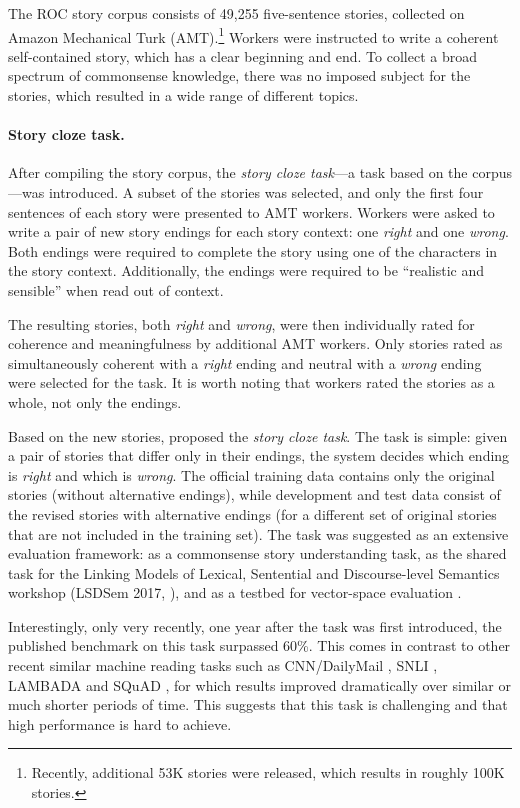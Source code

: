 \documentclass[11pt,a4paper]{article}
\newcommand{\nascomment}[1]{{\color{blue}\textsc{[#1 --nas]}}}
\begin{document}
The ROC story corpus consists of 49,255 five-sentence 
stories, collected on Amazon Mechanical Turk (AMT).\footnote{Recently,
  additional 53K stories were released, which results in roughly
  100K stories.}
Workers were instructed to write a coherent self-contained story, which has a clear beginning and end. 
To collect a broad spectrum of commonsense knowledge, there was no imposed subject for the stories,
which resulted in a wide range of different topics.

\paragraph{Story cloze task.}
After compiling the story corpus, the {\it story cloze task}---a task based on the corpus---was introduced.
A subset of the stories was selected, and only the first four sentences of each story were presented to AMT workers.
Workers were asked to write a pair of new story endings for each story context: one {\it right} and one {\it wrong}.
Both endings were required to complete the story using one of the characters in the story context. 
Additionally,  the endings were required to be ``realistic and sensible'' \cite{Mostafazadeh:2016} when read out of context.

The resulting stories, both {\it right} and {\it wrong}, were then individually rated for coherence and meaningfulness by additional AMT workers.
Only stories rated as simultaneously coherent with a {\it right} ending and neutral with a {\it wrong} ending were selected for the task. 
It is worth noting that workers rated the stories as a whole, not only the endings.

Based on the new stories, \citet{Mostafazadeh:2016} proposed the {\it story cloze task}. 
The task is simple:  given a pair of stories that differ only in their endings, the system decides which ending is {\it right} and which is {\it wrong}. 
The official training data contains only the original stories (without alternative endings), while development and test data consist of the revised stories with alternative endings (for a different set of original stories that are not included in the training set).
The task was suggested as an extensive evaluation framework:
as a commonsense story understanding task, 
as the shared task for the  Linking Models of Lexical, Sentential and Discourse-level Semantics workshop (LSDSem 2017, \citealp{LSDSem:2017}), and as a testbed for vector-space evaluation \cite{mostafazadeh2016story}.

Interestingly, only very recently, one year after the task was first introduced, the published benchmark on this task surpassed 60\%.
This comes in contrast to other recent similar machine reading tasks such as CNN/DailyMail \cite{hermann2015teaching}, SNLI \cite{bowman2015large}, LAMBADA \cite{Paperno:2016} and SQuAD \cite{rajpurkar2016squad}, for which results improved dramatically over similar or much shorter periods of time. This suggests that this task is challenging and that high performance is hard to achieve.
\end{document}
